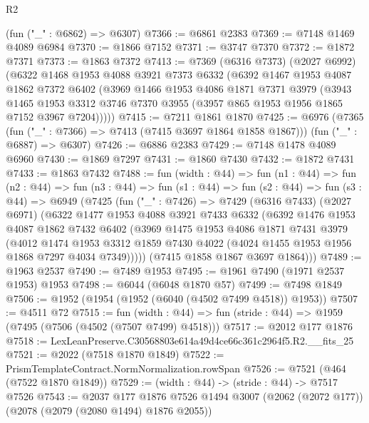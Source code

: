 \begin{lexlean}{R2}
\begin{coremodule}
    (fun ("_" : @6862) => @6307)
@7366 := @6861 @2383
@7369 := @7148 @1469 @4089 @6984
@7370 := @1866 @7152
@7371 := @3747 @7370
@7372 := @1872 @7371
@7373 := @1863 @7372
@7413 := @7369
    (@6316 @7373)
    (@2027 @6992)
    (@6322
      @1468
      @1953
      @4088
      @3921
      @7373
      @6332
      (@6392
        @1467
        @1953
        @4087
        @1862
        @7372
        @6402
        (@3969
          @1466
          @1953
          @4086
          @1871
          @7371
          @3979
          (@3943
            @1465
            @1953
            @3312
            @3746
            @7370
            @3955
            (@3957 @865 @1953 @1956 @1865 @7152 @3967 @7204)))))
@7415 := @7211 @1861 @1870
@7425 := @6976
    (@7365 (fun ("_" : @7366) => @7413 (@7415 @3697 @1864 @1858 @1867)))
    (fun ("_" : @6887) => @6307)
@7426 := @6886 @2383
@7429 := @7148 @1478 @4089 @6960
@7430 := @1869 @7297
@7431 := @1860 @7430
@7432 := @1872 @7431
@7433 := @1863 @7432
@7488 := fun (width : @44) =>
  fun (n1 : @44) =>
  fun (n2 : @44) =>
  fun (n3 : @44) =>
  fun (s1 : @44) =>
  fun (s2 : @44) =>
  fun (s3 : @44) =>
  @6949
    (@7425
      (fun ("_" : @7426) =>
      @7429
        (@6316 @7433)
        (@2027 @6971)
        (@6322
          @1477
          @1953
          @4088
          @3921
          @7433
          @6332
          (@6392
            @1476
            @1953
            @4087
            @1862
            @7432
            @6402
            (@3969
              @1475
              @1953
              @4086
              @1871
              @7431
              @3979
              (@4012
                @1474
                @1953
                @3312
                @1859
                @7430
                @4022
                (@4024 @1455 @1953 @1956 @1868 @7297 @4034 @7349)))))
        (@7415 @1858 @1867 @3697 @1864)))
@7489 := @1963 @2537
@7490 := @7489 @1953
@7495 := @1961 @7490 (@1971 @2537 @1953) @1953
@7498 := @6044 (@6048 @1870 @57)
@7499 := @7498 @1849
@7506 := @1952 (@1954 (@1952 (@6040 (@4502 @7499 @4518)) @1953))
@7507 := @4511 @72
@7515 := fun (width : @44) =>
  fun (stride : @44) => @1959 (@7495 (@7506 (@4502 (@7507 @7499) @4518)))
@7517 := @2012 @177 @1876
@7518 := LexLeanPreserve.C30568803e614a49d4ce66c361c2964f5.R2.__fits_25
@7521 := @2022 (@7518 @1870 @1849)
@7522 := PrismTemplateContract.NormNormalization.rowSpan
@7526 := @7521 (@464 (@7522 @1870 @1849))
@7529 := (width : @44) -> (stride : @44) -> @7517 @7526
@7543 := @2037
    @177
    @1876
    @7526
    @1494
    @3007
    (@2062 (@2072 @177))
    (@2078 (@2079 (@2080 @1494) @1876 @2055))

\end{coremodule}
\end{lexlean}
